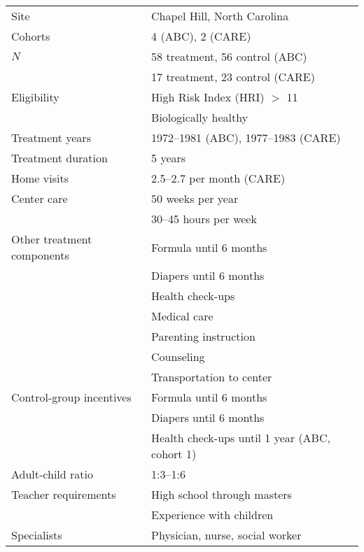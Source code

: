 \begin{tabular}{l l}
	\toprule
Site & Chapel Hill, North Carolina \\
Cohorts & 4 (ABC), 2 (CARE) \\
$N$ & 58 treatment, 56 control (ABC) \\
	& 17 treatment, 23 control (CARE) \\
\midrule
Eligibility & High Risk Index (HRI) $>$ 11 \\
		& Biologically healthy \\
\midrule
Treatment years & 1972--1981 (ABC), 1977--1983 (CARE) \\
Treatment duration & 5 years \\
\midrule
Home visits 	& 2.5--2.7	per month (CARE)	\\
Center care	& 50	weeks per year \\
		 	& 30--45 hours per week  \\
Other treatment components & Formula until 6 months\\
					& Diapers until 6 months \\
					& Health check-ups \\
					& Medical care \\
					& Parenting instruction \\
					& Counseling \\
					& Transportation to center \\
Control-group incentives & Formula until 6 months \\
				& Diapers until 6 months 	\\
				& Health check-ups until 1 year (ABC, cohort 1) \\
\midrule
Adult-child ratio & 1:3--1:6 \\
Teacher requirements & High school through masters \\
				& Experience with children \\
Specialists & Physician, nurse, social worker \\
\bottomrule
\end{tabular}



